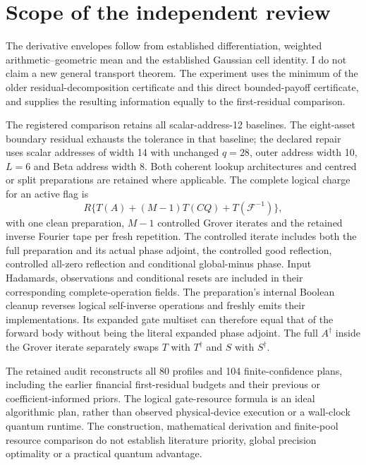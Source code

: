 \section{Scope of the independent review}
The derivative envelopes follow from established differentiation,
weighted arithmetic--geometric mean and the established Gaussian cell
identity. I do not claim a new general transport theorem. The experiment
uses the minimum of the older residual-decomposition certificate and this
direct bounded-payoff certificate, and supplies the resulting information
equally to the first-residual comparison.

The registered comparison retains all scalar-address-12 baselines.
The eight-asset boundary residual exhausts the tolerance in that baseline;
the declared repair uses scalar addresses of width 14 with unchanged
$q=28$, outer address width 10, $L=6$ and Beta address width 8. Both
coherent lookup architectures and centred or split preparations are retained
where applicable. The complete logical charge for an active flag is
\[
 R\{T(A)+(M-1)T(CQ)+T(\mathcal F^{-1})\},
\]
with one clean preparation, $M-1$ controlled Grover iterates and the
retained inverse Fourier tape per fresh repetition. The controlled iterate
includes both the full preparation and its actual phase adjoint, the
controlled good reflection, controlled all-zero reflection and conditional
global-minus phase. Input Hadamards, observations and conditional resets
are included in their corresponding complete-operation fields. The
preparation's internal Boolean cleanup reverses logical self-inverse
operations and freshly emits their implementations. Its expanded gate
multiset can therefore equal that of the forward body without being the
literal expanded phase adjoint. The full $A^\dagger$ inside the Grover
iterate separately swaps $T$ with $T^\dagger$ and $S$ with $S^\dagger$.

The retained audit reconstructs all 80 profiles and 104 finite-confidence
plans, including the earlier financial first-residual budgets and their
previous or coefficient-informed priors. The logical gate-resource formula
is an ideal algorithmic plan, rather than observed physical-device execution
or a wall-clock quantum runtime. The construction, mathematical derivation
and finite-pool resource comparison do not establish literature priority,
global precision optimality or a practical quantum advantage.
